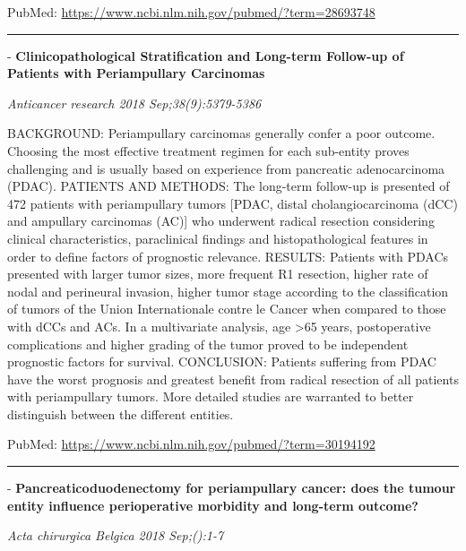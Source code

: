 \documentclass[]{article}
\begin{document}
PubMed: \url{https://www.ncbi.nlm.nih.gov/pubmed/?term=28693748}

{}

{}

\begin{center}\rule{0.5\linewidth}{\linethickness}\end{center}

 - \textbf{Clinicopathological Stratification and Long-term Follow-up of
Patients with Periampullary Carcinomas}

\emph{Anticancer research 2018 Sep;38(9):5379-5386}

BACKGROUND: Periampullary carcinomas generally confer a poor outcome.
Choosing the most effective treatment regimen for each sub-entity proves
challenging and is usually based on experience from pancreatic
adenocarcinoma (PDAC). PATIENTS AND METHODS: The long-term follow-up is
presented of 472 patients with periampullary tumors {[}PDAC, distal
cholangiocarcinoma (dCC) and ampullary carcinomas (AC){]} who underwent
radical resection considering clinical characteristics, paraclinical
findings and histopathological features in order to define factors of
prognostic relevance. RESULTS: Patients with PDACs presented with larger
tumor sizes, more frequent R1 resection, higher rate of nodal and
perineural invasion, higher tumor stage according to the classification
of tumors of the Union Internationale contre le Cancer when compared to
those with dCCs and ACs. In a multivariate analysis, age
\textgreater{}65 years, postoperative complications and higher grading
of the tumor proved to be independent prognostic factors for survival.
CONCLUSION: Patients suffering from PDAC have the worst prognosis and
greatest benefit from radical resection of all patients with
periampullary tumors. More detailed studies are warranted to better
distinguish between the different entities.

PubMed: \url{https://www.ncbi.nlm.nih.gov/pubmed/?term=30194192}

{}

{}

\begin{center}\rule{0.5\linewidth}{\linethickness}\end{center}

 - \textbf{Pancreaticoduodenectomy for periampullary cancer: does the
tumour entity influence perioperative morbidity and long-term outcome?}

\emph{Acta chirurgica Belgica 2018 Sep;():1-7}
\end{document}
